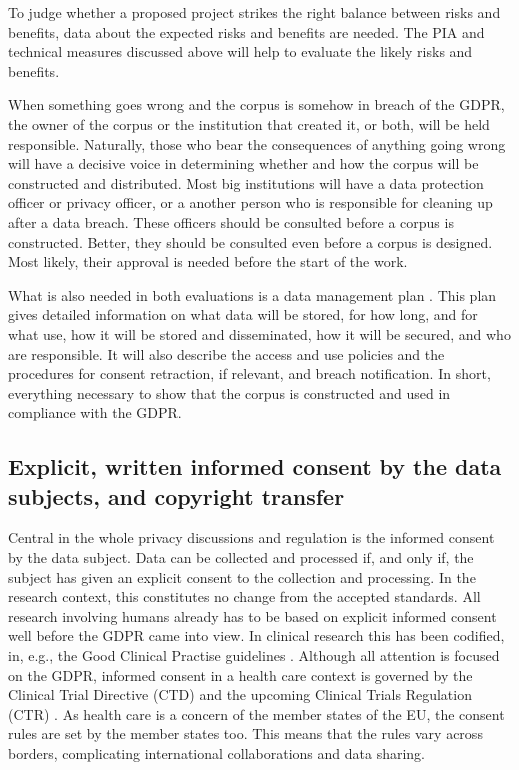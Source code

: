 \documentclass[10pt, a4paper]{article}
\begin{document}
To judge whether a proposed project strikes the right balance between risks and benefits, data about the expected risks and benefits are needed. The PIA and technical measures discussed above will help to evaluate the likely risks and benefits. 

When something goes wrong and the corpus is somehow in breach of the GDPR, the owner of the corpus or the institution that created it, or both, will be held responsible. Naturally, those who bear the consequences of anything going wrong will have a decisive voice in determining whether and how the corpus will be constructed and distributed. Most big institutions will have a data protection officer or privacy officer, or a another person who is responsible for cleaning up after a data breach. These officers should be consulted before a corpus is constructed. Better, they should be consulted even before a corpus is designed. Most likely, their approval is needed before the start of the work.

What is also needed in both evaluations is a data management plan \cite{AcademyFinland20DMP}. This plan gives detailed information on what data will be stored, for how long, and for what use, how it will be stored and disseminated, how it will be secured, and who are responsible. It will also describe the access and use policies and the procedures for consent retraction, if relevant, and breach notification. In short, everything necessary to show that the corpus is constructed and used in compliance with the GDPR.

\subsection{Explicit, written informed consent by the data subjects, and copyright transfer}

Central in the whole privacy discussions and regulation is the informed consent by the data subject. Data can be collected and processed if, and only if, the subject has given an explicit consent to the collection and processing. In the research context, this constitutes no change from the accepted standards. All research involving humans already has to be based on explicit informed consent well before the GDPR came into view. In clinical research this has been codified, in, e.g., the Good Clinical Practise guidelines \cite{ICH1996GCP}. Although all attention is focused on the GDPR, informed consent in a health care context is governed by the Clinical Trial Directive (CTD) and the upcoming Clinical Trials Regulation (CTR) \cite{dittrich2015esmod,EU2014CTR}. As health care is a concern of the member states of the EU, the consent rules are set by the member states too. This means that the rules vary across borders, complicating international collaborations and data sharing.
\end{document}
